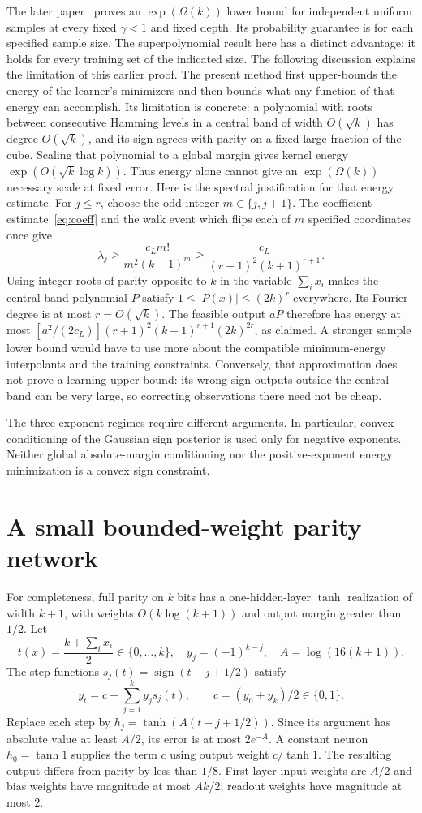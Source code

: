 \documentclass[11pt]{article}
\theoremstyle{remark}\newtheorem{remark}[theorem]{Remark}
\DeclareMathOperator{\sign}{sign}\DeclareMathOperator{\Var}{Var}
\begin{document}
The later paper~\cite{subcritical-exponential} proves an
$\exp(\Omega(k))$ lower bound for independent uniform samples at every
fixed $\gamma<1$ and fixed depth. Its probability guarantee is for each
specified sample size. The superpolynomial result here has a distinct
advantage: it holds for every training set of the indicated size.
The following discussion explains the limitation of this earlier proof. The present
method first upper-bounds the energy of the learner's minimizers and
then bounds what any function of that energy can accomplish. Its
limitation is concrete: a polynomial with roots between consecutive
Hamming levels in a central band of width $O(\sqrt{k})$ has degree
$O(\sqrt{k})$, and its sign agrees with parity on a fixed large
fraction of the cube. Scaling that polynomial to a global margin
gives kernel energy $\exp(O(\sqrt{k}\log k))$. Thus energy alone
cannot give an $\exp(\Omega(k))$ necessary scale at fixed error.
Here is the spectral justification for that energy estimate.
For $j\le r$, choose the odd integer $m\in\{j,j+1\}$.
The coefficient estimate~\eqref{eq:coeff} and the walk event
which flips each of $m$ specified coordinates once give
\[
 \lambda_j\ge\frac{c_Lm!}{m^2(k+1)^m}
 \ge\frac{c_L}{(r+1)^2(k+1)^{r+1}}.
\]
Using integer roots of parity opposite to $k$ in the variable
$\sum_i x_i$ makes the central-band polynomial $P$ satisfy
$1\le|P(x)|\le(2k)^r$ everywhere. Its Fourier degree is at most
$r=O(\sqrt{k})$. The feasible output $aP$ therefore has energy
at most
$[a^2/(2c_L)](r+1)^2(k+1)^{r+1}(2k)^{2r}$, as claimed.
A stronger sample lower bound would have to use more about the
compatible minimum-energy interpolants and the training constraints.
Conversely, that approximation does not prove a learning upper
bound: its wrong-sign outputs outside the central band can be very
large, so correcting observations there need not be cheap.

The three exponent regimes require different arguments. In particular,
convex conditioning of the Gaussian sign posterior is used only for
negative exponents. Neither global absolute-margin conditioning nor
the positive-exponent energy minimization is a convex sign constraint.

\appendix
\section{A small bounded-weight parity network}\label{sec:paritycircuit}
For completeness, full parity on $k$ bits has a one-hidden-layer
$\tanh$ realization of width $k+1$, with weights $O(k\log(k+1))$
and output margin greater than $1/2$. Let
\[
 t(x)=\frac{k+\sum_i x_i}{2}\in\{0,\ldots,k\},\quad
 y_j=(-1)^{k-j},\quad A=\log(16(k+1)).
\]
The step functions $s_j(t)=\sign(t-j+1/2)$ satisfy
\[
 y_t=c+\sum_{j=1}^k y_js_j(t),\qquad c=(y_0+y_k)/2\in\{0,1\}.
\]
Replace each step by $h_j=\tanh(A(t-j+1/2))$. Since its argument
has absolute value at least $A/2$, its error is at most $2e^{-A}$.
A constant neuron $h_0=\tanh1$ supplies the term $c$ using output
weight $c/\tanh1$. The resulting output differs from parity by
less than $1/8$. First-layer input weights are $A/2$ and bias
weights have magnitude at most $Ak/2$; readout weights have
magnitude at most $2$.
\end{document}

